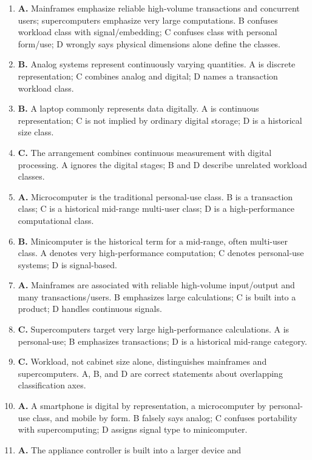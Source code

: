\begin{enumerate}[label=\textbf{Q\arabic*.}, leftmargin=*]
\item \textbf{A.} Mainframes emphasize reliable high-volume transactions
  and concurrent users; supercomputers emphasize very large computations.
  B confuses workload class with signal/embedding; C confuses class with
  personal form/use; D wrongly says physical dimensions alone define the
  classes.
\item \textbf{B.} Analog systems represent continuously varying quantities.
  A is discrete representation; C combines analog and digital; D names a
  transaction workload class.
\item \textbf{B.} A laptop commonly represents data digitally. A is
  continuous representation; C is not implied by ordinary digital storage;
  D is a historical size class.
\item \textbf{C.} The arrangement combines continuous measurement with
  digital processing. A ignores the digital stages; B and D describe
  unrelated workload classes.
\item \textbf{A.} Microcomputer is the traditional personal-use class. B is
  a transaction class; C is a historical mid-range multi-user class; D is
  a high-performance computational class.
\item \textbf{B.} Minicomputer is the historical term for a mid-range,
  often multi-user class. A denotes very high-performance computation; C
  denotes personal-use systems; D is signal-based.
\item \textbf{A.} Mainframes are associated with reliable high-volume
  input/output and many transactions/users. B emphasizes large calculations;
  C is built into a product; D handles continuous signals.
\item \textbf{C.} Supercomputers target very large high-performance
  calculations. A is personal-use; B emphasizes transactions; D is a
  historical mid-range category.
\item \textbf{C.} Workload, not cabinet size alone, distinguishes mainframes
  and supercomputers. A, B, and D are correct statements about overlapping
  classification axes.
\item \textbf{A.} A smartphone is digital by representation, a microcomputer
  by personal-use class, and mobile by form. B falsely says analog; C
  confuses portability with supercomputing; D assigns signal type to
  minicomputer.
\item \textbf{A.} The appliance controller is built into a larger device and

\end{enumerate}
